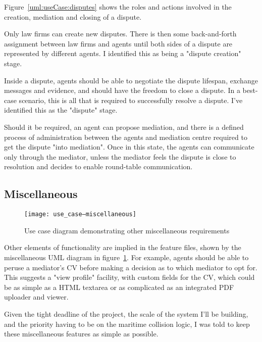 Figure~\ref{uml:useCase:disputes} shows the roles and actions involved in the creation, mediation and closing of a dispute.

Only law firms can create new disputes. There is then some back-and-forth assignment between law firms and agents until both sides of a dispute are represented by different agents. I identified this as being a "dispute creation" stage.

Inside a dispute, agents should be able to negotiate the dispute lifespan, exchange messages and evidence, and should have the freedom to close a dispute. In a best-case scenario, this is all that is required to successfully resolve a dispute. I've identified this as the "dispute" stage.

Should it be required, an agent can propose mediation, and there is a defined process of administration between the agents and mediation centre required to get the dispute "into mediation". Once in this state, the agents can communicate only through the mediator, unless the mediator feels the dispute is close to resolution and decides to enable round-table communication.

\subsection{Miscellaneous}

\begin{figure}[h!]
  \centering
    \texttt{[image: use\_case--miscellaneous]}
  \caption{Use case diagram demonstrating other miscellaneous requirements}
  \label{uml:useCase:miscellaneous}
\end{figure}

Other elements of functionality are implied in the feature files, shown by the miscellaneous UML diagram in figure~\ref{uml:useCase:miscellaneous}. For example, agents should be able to peruse a mediator's CV before making a decision as to which mediator to opt for. This suggests a "view profile" facility, with custom fields for the CV, which could be as simple as a HTML textarea or as complicated as an integrated PDF uploader and viewer.

Given the tight deadline of the project, the scale of the system I'll be building, and the priority having to be on the maritime collision logic, I was told to keep these miscellaneous features as simple as possible.